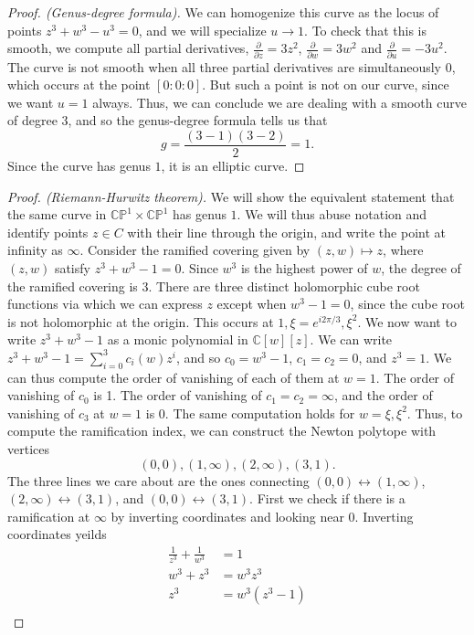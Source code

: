 \documentclass{article}
\begin{document}
\begin{enumerate}
\begin{proof}[Proof. (Genus-degree formula)]
	We can homogenize this curve as the locus of points $z^3+w^3-u^3 = 0$, and we will specialize $ u \rightarrow 1$.
	To check that this is smooth, we compute all partial derivatives, 
	$\frac{\partial}{\partial z} = 3z^2$, $\frac{\partial}{\partial w} = 3w^2$ and $\frac{\partial}{\partial u} = -3u^2$.
	The curve is not smooth when all three partial derivatives are simultaneously $0$, which occurs at the point $[0:0:0]$.
	But such a point is not on our curve, since we want $u=1$ always. Thus, we can conclude we are dealing with a smooth 
	curve of degree $3$, and so the genus-degree formula tells us that 
	\[ g = \frac{(3-1)(3-2)}{2} = 1.\]
	Since the curve has genus $1$, it is an elliptic curve.
	\end{proof}
	\begin{proof}[Proof. (Riemann-Hurwitz theorem)]
	We will show the equivalent statement that the same curve in $\mathbb{CP}^1\times \mathbb{CP}^1$
	has genus $1$.
	We will thus abuse notation and identify points $z \in C$ with their line through the origin,
	and write the point at infinity as $\infty$.
	Consider the ramified covering given by $(z,w) \mapsto z$, where $(z,w)$ satisfy
	$z^3+w^3 -1 = 0$. Since $w^3$ is the highest power of $w$, the degree of the ramified covering is $3$.
	There are three distinct holomorphic cube root functions via which we can express $z$ except when 
	$w^3-1 = 0$, since the cube root is not holomorphic at the origin. This occurs at $1, \xi=e^{i 2\pi/3}, \xi^2$.
	We now want to write $z^3+w^3-1$ as a monic polynomial in $\mathbb{C}[w][z]$.
	We can write $z^3 + w^3-1 = \sum_{i=0}^3 c_i(w) z^i$, and so $c_0 = w^3-1$, $c_1=c_2=0$, and $z^3=1$.
	We can thus compute the order of vanishing of each of them at $w=1$.
	The order of vanishing of $c_0$ is 1. The order of vanishing of $c_1=c_2= \infty$, and the order of vanishing
	of $c_3$ at $w=1$ is 0.
	The same computation holds for $w=\xi, \xi^2$.
	Thus, to compute the ramification index, we can construct the Newton polytope with vertices 
	\[ (0,0), (1,\infty), (2,\infty), (3,1).\]
	The three lines we care about are the ones connecting $(0,0) \leftrightarrow (1,\infty)$, $(2,\infty) \leftrightarrow (3,1)$, and $(0,0) \leftrightarrow (3,1)$. 
	First we check if there is a ramification at $\infty$ by inverting coordinates and looking near $0$.
	Inverting coordinates yeilds
	\begin{align*}
		\frac{1}{z^3} + \frac1{w^3} &= 1\\
		w^3 + z^3 &= w^3z^3\\
		z^3 &= w^3(z^3-1)\\

\end{align*}
\end{proof}
\end{enumerate}
\end{document}
